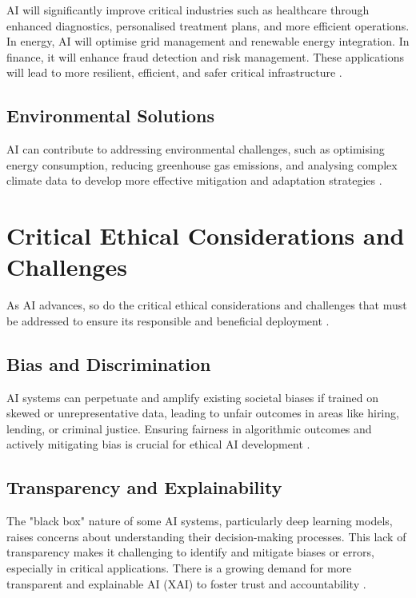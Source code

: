 AI will significantly improve critical industries such as healthcare through enhanced diagnostics, personalised treatment plans, and more efficient operations. In energy, AI will optimise grid management and renewable energy integration. In finance, it will enhance fraud detection and risk management. These applications will lead to more resilient, efficient, and safer critical infrastructure \parencite{reed2023future}.

\subsection{Environmental Solutions}

AI can contribute to addressing environmental challenges, such as optimising energy consumption, reducing greenhouse gas emissions, and analysing complex climate data to develop more effective mitigation and adaptation strategies \parencite{aiindex2023}.

\section{Critical Ethical Considerations and Challenges}

As AI advances, so do the critical ethical considerations and challenges that must be addressed to ensure its responsible and beneficial deployment \parencite{boppiniti2022ethical}.

\subsection{Bias and Discrimination}

AI systems can perpetuate and amplify existing societal biases if trained on skewed or unrepresentative data, leading to unfair outcomes in areas like hiring, lending, or criminal justice. Ensuring fairness in algorithmic outcomes and actively mitigating bias is crucial for ethical AI development \parencite{boppiniti2022ethical}.

\subsection{Transparency and Explainability}

The "black box" nature of some AI systems, particularly deep learning models, raises concerns about understanding their decision-making processes. This lack of transparency makes it challenging to identify and mitigate biases or errors, especially in critical applications. There is a growing demand for more transparent and explainable AI (XAI) to foster trust and accountability \parencite{boppiniti2022ethical}.

